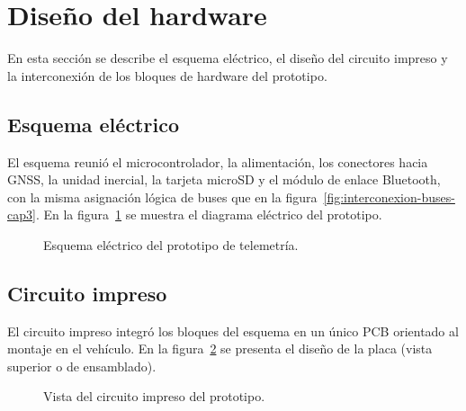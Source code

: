 \section{Diseño del hardware}
\label{sec:diseno-hardware}

En esta sección se describe el esquema eléctrico, el diseño del circuito impreso y la interconexión de los bloques de hardware del prototipo.

\subsection{Esquema eléctrico}

El esquema reunió el microcontrolador, la alimentación, los conectores hacia GNSS, la unidad inercial, la tarjeta microSD y el módulo de enlace Bluetooth, con la misma asignación lógica de buses que en la figura~\ref{fig:interconexion-buses-cap3}. En la figura~\ref{fig:cap3-esquema-electrico} se muestra el diagrama eléctrico del prototipo.

\begin{figure}[H]
	\centering
	\caption[Esquema eléctrico]{Esquema eléctrico del prototipo de telemetría.}
	\label{fig:cap3-esquema-electrico}
\end{figure}

\subsection{Circuito impreso}

El circuito impreso integró los bloques del esquema en un único PCB orientado al montaje en el vehículo. En la figura~\ref{fig:cap3-pcb} se presenta el diseño de la placa (vista superior o de ensamblado).

\begin{figure}[H]
	\centering
	\caption[Circuito impreso]{Vista del circuito impreso del prototipo.}
	\label{fig:cap3-pcb}
\end{figure}

